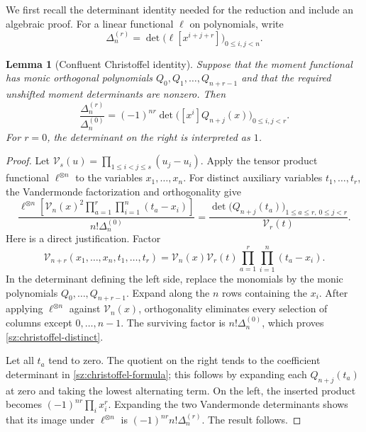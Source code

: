 \documentclass[11pt]{article}
\numberwithin{equation}{section}
\newtheorem{lemma}[lemma]{Lemma}
\theoremstyle{definition}
\theoremstyle{remark}
\begin{document}
We first recall the determinant identity needed for the reduction and
include an algebraic proof.  For a linear functional $\ell$ on
polynomials, write
\[
 \Delta_n^{(r)}=\det\bigl(\ell[x^{i+j+r}]\bigr)_{0\le i,j<n}.
\]

\begin{lemma}[Confluent Christoffel identity]\label{sz:christoffel}
Suppose that the moment functional has monic orthogonal polynomials
$Q_0,Q_1,\ldots,Q_{n+r-1}$ and that the required unshifted moment
determinants are nonzero.  Then
\begin{equation}\label{sz:christoffel-formula}
 \frac{\Delta_n^{(r)}}{\Delta_n^{(0)}}
 =(-1)^{nr}
 \det\bigl([x^i]Q_{n+j}(x)\bigr)_{0\le i,j<r}.
\end{equation}
For $r=0$, the determinant on the right is interpreted as $1$.
\end{lemma}

\begin{proof}
Let $\mathcal V_s(u)=\prod_{1\le i<j\le s}(u_j-u_i)$.
Apply the tensor product functional $\ell^{\otimes n}$ to the variables
$x_1,\ldots,x_n$.  For distinct auxiliary variables $t_1,\ldots,t_r$,
the Vandermonde factorization and orthogonality give
\begin{equation}\label{sz:christoffel-distinct}
 \frac{\ell^{\otimes n}\!\left[
 \mathcal V_n(x)^2\prod_{a=1}^{r}\prod_{i=1}^{n}(t_a-x_i)
 \right]}{n!\Delta_n^{(0)}}
 =\frac{\det\bigl(Q_{n+j}(t_a)\bigr)_{
 1\le a\le r,\,0\le j<r}}{\mathcal V_r(t)}.
\end{equation}
Here is a direct justification.  Factor
\[
 \mathcal V_{n+r}(x_1,\ldots,x_n,t_1,\ldots,t_r)
 =\mathcal V_n(x)\mathcal V_r(t)
 \prod_{a=1}^{r}\prod_{i=1}^{n}(t_a-x_i).
\]
In the determinant defining the left side, replace the monomials by the
monic polynomials $Q_0,\ldots,Q_{n+r-1}$.  Expand along the $n$ rows
containing the $x_i$.  After applying $\ell^{\otimes n}$ against
$\mathcal V_n(x)$, orthogonality eliminates every selection of columns
except $0,\ldots,n-1$.  The surviving factor is
$n!\Delta_n^{(0)}$, which proves \eqref{sz:christoffel-distinct}.

Let all $t_a$ tend to zero.  The quotient on the right tends to the
coefficient determinant in \eqref{sz:christoffel-formula}; this follows
by expanding each $Q_{n+j}(t_a)$ at zero and taking the lowest alternating
term.  On the left, the inserted product becomes
$(-1)^{nr}\prod_i x_i^r$.  Expanding the two Vandermonde determinants
shows that its image under $\ell^{\otimes n}$ is
$(-1)^{nr}n!\Delta_n^{(r)}$.  The result follows.
\end{proof}
\end{document}

